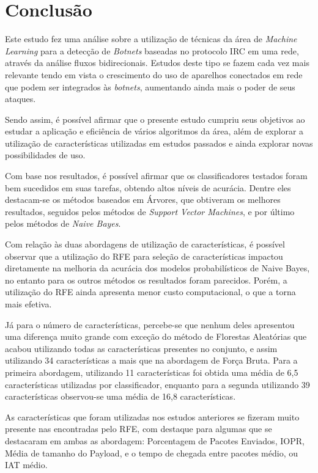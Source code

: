 \chapter{Conclusão}
\label{c.conclusao}

Este estudo fez uma análise sobre a utilização de técnicas da área de \textit{Machine Learning} para a detecção de \textit{Botnets} baseadas no protocolo IRC em uma rede, através da análise fluxos bidirecionais. Estudos deste tipo se fazem cada vez mais relevante tendo em vista o crescimento do uso de aparelhos conectados em rede que podem ser integrados às \textit{botnets}, aumentando ainda mais o poder de seus ataques.

Sendo assim, é possível afirmar que o presente estudo cumpriu seus objetivos ao estudar a aplicação e eficiência de vários algoritmos da área, além de explorar a utilização de características utilizadas em estudos passados e ainda explorar novas possibilidades de uso. 

Com base nos resultados, é possível afirmar que os classificadores testados foram bem sucedidos em suas tarefas, obtendo altos níveis de acurácia. Dentre eles destacam-se os métodos baseados em Árvores, que obtiveram os melhores resultados, seguidos pelos métodos de \textit{Support Vector Machines}, e por último pelos métodos de \textit{Naive Bayes}.

Com relação às duas abordagens de utilização de características, é possível observar que a utilização do RFE para seleção de características impactou diretamente na melhoria da acurácia dos modelos probabilísticos de Naive Bayes, no entanto para os outros métodos os resultados foram parecidos. Porém, a utilização do RFE ainda apresenta menor custo computacional, o que a torna mais efetiva.

Já para o número de características, percebe-se que nenhum deles apresentou uma diferença muito grande com exceção do método de Florestas Aleatórias que acabou utilizando todas as características presentes no conjunto, e assim utilizando 34 características a mais que na abordagem de Força Bruta. Para a primeira abordagem, utilizando 11 características foi obtida uma média de 6,5 características utilizadas por classificador, enquanto para a segunda utilizando 39 características observou-se uma média de 16,8 características.

As características que foram utilizadas nos estudos anteriores se fizeram muito presente nas encontradas pelo RFE, com destaque para algumas que se destacaram em ambas as abordagem: Porcentagem de Pacotes Enviados, IOPR, Média de tamanho do Payload, e o tempo de chegada entre pacotes médio, ou IAT médio. 

